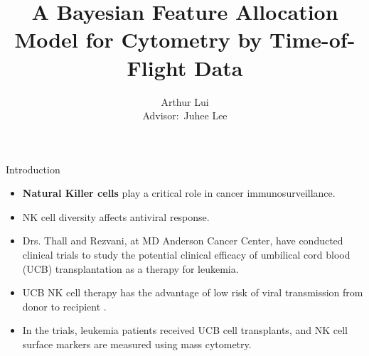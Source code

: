 \documentclass[ignorenonframetext,]{beamer}
\title[Bayesian FAM for CyTOF Data]{A Bayesian Feature Allocation Model for Cytometry by Time-of-Flight Data}
\author[A. Lui]{Arthur Lui \\ {\small Advisor$\colon$ Juhee Lee}}
\institute{Department of Statistics\\ UC Santa Cruz}
\begin{document}


\begin{frame}{Introduction}
  \begin{itemize}
    \setlength\itemsep{1em}
    \item
      \textbf{Natural Killer cells} play a critical role in cancer immunosurveillance.
    \item NK cell diversity affects antiviral response.
    \item Drs. Thall and Rezvani, at MD Anderson Cancer
      Center, have conducted clinical trials to study the potential clinical
      efficacy of umbilical cord blood (UCB) transplantation as a therapy for
      leukemia.
    \item UCB NK cell therapy has the advantage of low risk of viral
      transmission from donor to recipient \citep{sarvaria2017umbilical}.
    \item In the trials, leukemia patients received UCB cell transplants, and
      NK cell surface markers are measured using mass cytometry.
  \end{itemize}
\end{frame}
\end{document}
